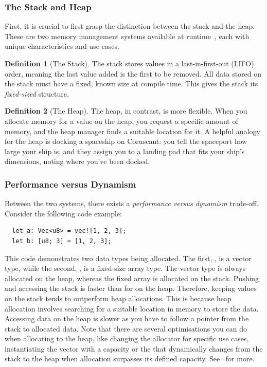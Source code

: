 \documentclass[11pt]{report}
\theoremstyle{definition}
\newtheorem{definition}{Definition}[section]
\theoremstyle{plain}
\begin{document}
\subsubsection{The Stack and Heap}
First, it is crucial to first grasp the distinction between the stack and the heap. These are two memory management systems available at runtime~\cite[ch.4]{rustlangRustProgramming}, each with unique characteristics and use cases.

\begin{definition}[The Stack]
  The stack stores values in a last-in-first-out (LIFO) order, meaning the last value added is the first to be removed. All data stored on the stack must have a fixed, known size at compile time. This gives the stack its \textit{fixed-sized} structure.
\end{definition}

\begin{definition}[The Heap]
  The heap, in contrast, is more flexible. When you allocate memory for a value on the heap, you request a specific amount of memory, and the heap manager finds a suitable location for it. A helpful analogy for the heap is docking a spaceship on Coruscant: you tell the spaceport how large your ship is, and they assign you to a landing pad that fits your ship's dimensions, noting where you've been docked.
\end{definition}

\subsubsection{Performance versus Dynamism}

Between the two systems, there exists a \textit{performance versus dynamism} trade-off. Consider the following code example:

\begin{verbatim}
  let a: Vec<u8> = vec![1, 2, 3];
  let b: [u8; 3] = [1, 2, 3];
\end{verbatim}

This code demonstrates two data types being allocated. The first, , is a vector type, while the second, , is a fixed-size array type. The vector type is always allocated on the heap, whereas the fixed array is allocated on the stack. Pushing  and accessing the stack is faster than for on the heap. Therefore, keeping values on the stack tends to outperform heap allocations. This is because heap allocation involves searching for a suitable location in memory to store the data. Accessing data on the heap is slower as you have to follow a pointer from the stack to allocated data. Note that there are several optimisations you can do when allocating to the heap, like changing the allocator for specific use cases, instantiating the vector with a capacity or the  that dynamically changes from the stack to the heap when allocation surpasses its defined capacity. See~\cite{rustlangPerformanceBook} for more.
\end{document}
